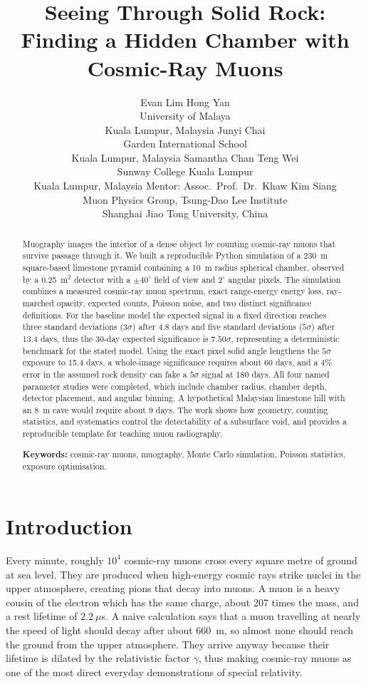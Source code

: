 \documentclass{article}
\title{Seeing Through Solid Rock:\\
       Finding a Hidden Chamber with Cosmic-Ray Muons}
\author{%
  Evan Lim Hong Yan \\
  University of Malaya \\
  Kuala Lumpur, Malaysia
  \And
  Junyi Chai \\
  Garden International School \\
  Kuala Lumpur, Malaysia
  \And
  Samantha Chan Teng Wei \\
  Sunway College Kuala Lumpur \\
  Kuala Lumpur, Malaysia
  \AND
  Mentor: Assoc.\ Prof.\ Dr.\ Khaw Kim Siang \\
  Muon Physics Group, Tsung-Dao Lee Institute \\
  Shanghai Jiao Tong University, China
}
\begin{document}
\maketitle

\begin{abstract}
Muography images the interior of a dense object by counting cosmic-ray muons
that survive passage through it. We built a reproducible Python simulation of a
230~m square-based limestone pyramid containing a 10~m radius spherical
chamber, observed by a 0.25~m$^2$ detector with a $\pm40^\circ$ field of view
and $2^\circ$ angular pixels. The simulation combines a measured cosmic-ray
muon spectrum, exact range-energy energy loss, ray-marched opacity, expected
counts, Poisson noise, and two distinct significance definitions. For the
baseline model the expected signal in a fixed direction reaches three standard
deviations ($3\sigma$) after 4.8 days and five standard deviations
($5\sigma$) after 13.4 days, thus the 30-day expected significance is
$7.50\sigma$, representing a deterministic benchmark for the stated model. Using the exact pixel solid angle lengthens the $5\sigma$
exposure to 15.4 days, a whole-image significance requires about 60 days, and a
4\% error in the assumed rock density can fake a $5\sigma$ signal at 180 days.
All four named parameter studies were completed, which include chamber radius, chamber
depth, detector placement, and angular binning. A hypothetical Malaysian
limestone hill with an 8~m cave would require about 9 days. The work shows how
geometry, counting statistics, and systematics control the detectability of a
subsurface void, and provides a reproducible template for teaching muon
radiography.

\textbf{Keywords:} cosmic-ray muons, muography, Monte Carlo simulation,
Poisson statistics, exposure optimisation.
\end{abstract}

\section{Introduction}

Every minute, roughly $10^4$ cosmic-ray muons cross every square metre of
ground at sea level. They are produced when high-energy cosmic rays strike
nuclei in the upper atmosphere, creating pions that decay into muons. A muon is
a heavy cousin of the electron which has the same charge, about 207 times the mass, and
a rest lifetime of $2.2~\mu$s. A naive calculation says that a muon travelling
at nearly the speed of light should decay after about 660~m, so almost none
should reach the ground from the upper atmosphere. They arrive anyway because
their lifetime is dilated by the relativistic factor $\gamma$, thus making cosmic-ray muons
as one of the most direct everyday demonstrations of special relativity.
\end{document}
